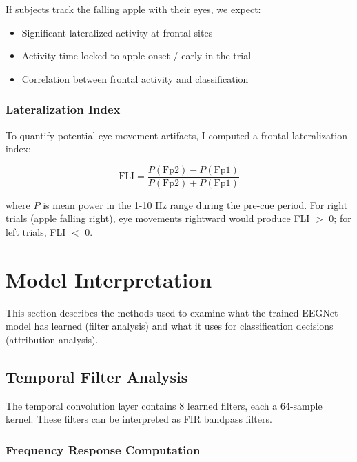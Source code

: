 If subjects track the falling apple with their eyes, we expect:

\begin{itemize}
    \item Significant lateralized activity at frontal sites
    \item Activity time-locked to apple onset / early in the trial
    \item Correlation between frontal activity and classification
\end{itemize}

\subsubsection{Lateralization Index}

To quantify potential eye movement artifacts, I computed a frontal lateralization index:

\begin{equation}
    \text{FLI} = \frac{P(\text{Fp2}) - P(\text{Fp1})}{P(\text{Fp2}) + P(\text{Fp1})}
\end{equation}

where $P$ is mean power in the 1-10 Hz range during the pre-cue period. For right trials (apple falling right), eye movements rightward would produce FLI $>$ 0; for left trials, FLI $<$ 0.


\section{Model Interpretation}
\label{sec:methods_interpretation}

This section describes the methods used to examine what the trained EEGNet model has learned (filter analysis) and what it uses for classification decisions (attribution analysis).


\subsection{Temporal Filter Analysis}
\label{subsec:methods_temporal_filters}

The temporal convolution layer contains 8 learned filters, each a 64-sample kernel. These filters can be interpreted as FIR bandpass filters.

\subsubsection{Frequency Response Computation}

